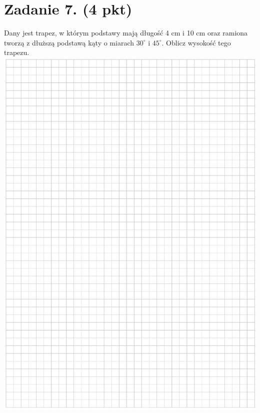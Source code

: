 \documentclass[10pt]{article}
\begin{document}
\section*{Zadanie 7. (4 pkt)}
Dany jest trapez, w którym podstawy mają długość 4 cm i 10 cm oraz ramiona tworzą z dłuższą podstawą kąty o miarach \(30^{\circ}\) i \(45^{\circ}\). Oblicz wysokość tego trapezu.\\
\includegraphics[max width=\textwidth, center]{2024_11_21_2f72fc0c2faed8928619g-10}\\
\end{document}

